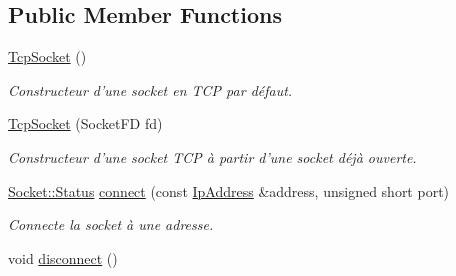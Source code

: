 \subsection*{Public Member Functions}
\begin{DoxyCompactItemize}
\item 
\hypertarget{classmognetwork_1_1_tcp_socket_ae3ffb22c96fde72fbf2723c6f250f3be}{\hyperlink{classmognetwork_1_1_tcp_socket_ae3ffb22c96fde72fbf2723c6f250f3be}{Tcp\-Socket} ()}\label{classmognetwork_1_1_tcp_socket_ae3ffb22c96fde72fbf2723c6f250f3be}

\begin{DoxyCompactList}\small\item\em Constructeur d'une socket en T\-C\-P par défaut. \end{DoxyCompactList}\item 
\hyperlink{classmognetwork_1_1_tcp_socket_abd9e4da7abe977703de3d10aa02ec3c0}{Tcp\-Socket} (Socket\-F\-D fd)
\begin{DoxyCompactList}\small\item\em Constructeur d'une socket T\-C\-P à partir d'une socket déjà ouverte. \end{DoxyCompactList}\item 
\hyperlink{classmognetwork_1_1_socket_aa187a8394ac0d6203af0ec7f021ca15f}{Socket\-::\-Status} \hyperlink{classmognetwork_1_1_tcp_socket_a370b1ee9cfd40eb1c8a2a4ee47303363}{connect} (const \hyperlink{classmognetwork_1_1_ip_address}{Ip\-Address} \&address, unsigned short port)
\begin{DoxyCompactList}\small\item\em Connecte la socket à une adresse. \end{DoxyCompactList}\item 
\hypertarget{classmognetwork_1_1_tcp_socket_a4da14b8d1e0f71bfae8c0fe6eb54be19}{void \hyperlink{classmognetwork_1_1_tcp_socket_a4da14b8d1e0f71bfae8c0fe6eb54be19}{disconnect} ()}\label{classmognetwork_1_1_tcp_socket_a4da14b8d1e0f71bfae8c0fe6eb54be19}


\end{DoxyCompactItemize}
